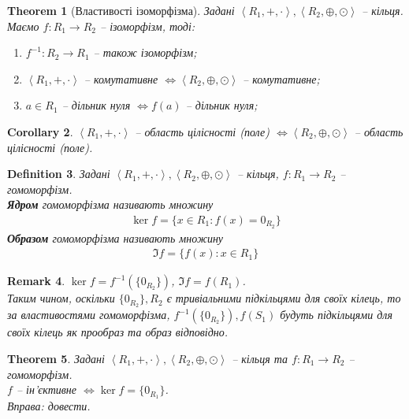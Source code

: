 \documentclass[a4paper, 10pt]{article}
\theoremstyle{theoremdd}
\newtheorem{theorem}{Theorem}[subsection]
\theoremstyle{theoremdd}
\newtheorem{definition}[theorem]{Definition}
\theoremstyle{theoremdd}
\theoremstyle{theoremdd}
\theoremstyle{theoremdd}
\theoremstyle{theoremdd}
\theoremstyle{theoremdd}
\theoremstyle{theoremdd}
\theoremstyle{theoremdd}
\theoremstyle{theoremdd}
\theoremstyle{theoremdd}
\newtheorem{remark}[theorem]{Remark}
\theoremstyle{theoremdd}
\theoremstyle{theoremdd}
\theoremstyle{theoremdd}
\newtheorem{corollary}[theorem]{Corollary}
\theoremstyle{theoremdd}
\begin{document}
\begin{theorem}[Властивості ізоморфізма]
Задані $\left<R_1, +, \cdot\right>, \left<R_2, \oplus, \odot \right>$ -- кільця. Маємо $f \colon R_1 \to R_2$ -- ізоморфізм, тоді:
\begin{enumerate}[nosep,wide=0pt,label={\arabic*)}]
\item $f^{-1} \colon R_2 \to R_1$ -- також ізоморфізм;
\item $\left< R_1, +, \cdot \right>$ -- комутативне $\iff \left< R_2, \oplus, \odot \right>$ -- комутативне;
\item $a \in R_1$ -- дільник нуля $\iff f(a)$ -- дільник нуля;
\end{enumerate}
\end{theorem}

\begin{corollary}
$\left< R_1, +, \cdot \right>$ -- область цілісності (поле) $\iff \left< R_2, \oplus, \odot \right>$ -- область цілісності (поле).
\end{corollary}

\begin{definition}
Задані $\left<R_1, +, \cdot \right>,\left<R_2, \oplus, \odot \right>$ -- кільця, $f \colon R_1 \to R_2$ -- гомоморфізм.\\
\textbf{Ядром} гомоморфізма називають множину
\begin{align*}
\ker f = \{ x \in R_1: f(x) = 0_{R_2} \}
\end{align*}
\textbf{Образом} гомоморфізма називають множину
\begin{align*}
\Im f = \{f(x) : x \in R_1\}
\end{align*}
\end{definition}

\begin{remark}
$\ker f = f^{-1}(\{0_{R_2}\})$, \qquad $\Im f = f(R_1)$.\\
Таким чином, оскільки $\{0_{R_2}\}, R_2$ є тривіальними підкільцями для своїх кілець, то за властивостями гомоморфізма, $f^{-1}(\{0_{R_2}\}), f(S_1)$ будуть підкільцями для своїх кілець як прообраз та образ відповідно.
\end{remark}

\begin{theorem}
Задані $\left<R_1, +, \cdot \right>,\left<R_2, \oplus, \odot \right>$ -- кільця та $f \colon R_1 \to R_2$ -- гомоморфізм.\\
$f$ -- ін'єктивне $\iff \ker f = \{0_{R_1}\}$.\\
\textit{Вправа: довести.}
\end{theorem}
\end{document}

